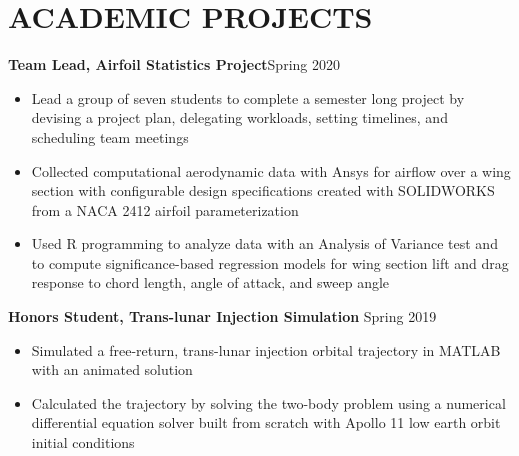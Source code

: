 \documentclass{article}
\begin{document}
\section{ACADEMIC PROJECTS}

\textbf{Team Lead, Airfoil Statistics Project}\hfill Spring 2020
\vspace{0.5em}
\begin{itemize}
	\item Lead a group of seven students to complete a semester long project by devising a project plan, delegating workloads, setting timelines, and scheduling team meetings
	\item Collected computational aerodynamic data with Ansys for airflow over a wing section with configurable design specifications created with SOLIDWORKS from a NACA 2412 airfoil parameterization
	\item Used R programming to analyze data with an Analysis of Variance test and to compute significance-based regression models for wing section lift and drag response to chord length, angle of attack, and sweep angle
\end{itemize}
\vspace{0.5em}
\textbf{Honors Student, Trans-lunar Injection Simulation} 
\hfill
Spring 2019
\vspace{0.5em}
\begin{itemize}
	\item Simulated a free-return, trans-lunar injection orbital trajectory in MATLAB with an animated solution
	\item Calculated the trajectory by solving the two-body problem using a numerical differential equation solver built from scratch with Apollo 11 low earth orbit initial conditions
\end{itemize}

\thispagestyle{empty}
\end{document}
